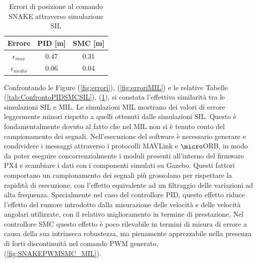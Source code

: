 \begin{table}
	\centering
	\caption{Errori di posizione al comando SNAKE attraverso simulazione SIL}
	\begin{tabular}{c c c}
		\hline
		Errore &  PID [m] & SMC [m] \\
		\hline
		$\epsilon_{max}$ & 0.47 & 0.31  \\
		$\epsilon_{medio}$ & 0.06 & 0.04  \\
		\hline
	\end{tabular}	
	\label{tab:ConfrontoPIDSMCMIL}
\end{table}

Confrontando le Figure (\ref{fig:errori}), (\ref{fig:erroriMIL}) e le relative Tabelle (\ref{tab:ConfrontoPIDSMCSIL}), (\ref{tab:ConfrontoPIDSMCMIL}), si constata l'effettiva similarità tra le simulazioni SIL e MIL. Le simulazioni MIL mostrano dei valori di errore leggermente minori rispetto a quelli ottenuti dalle simulazioni SIL. Questo è fondamentalmente dovuto al fatto che nel MIL non si è tenuto conto del campionamento dei segnali. Nell'esecuzione del software è necessario generare e condividere i messaggi attraverso i protocolli MAVLink e $\micro$ORB, in modo da poter eseguire concorrenzialmente i moduli presenti all'interno del firmware PX4 e scambiare i dati con i componenti simulati su Gazebo. Questi fattori comportano un campionamento dei segnali più grossolano per rispettare la rapidità di esecuzione, con l'effetto equivalente ad un filtraggio delle variazioni ad alta frequenza. Specialmente nel caso del controllore PID, questo effetto riduce l'effetto del rumore introdotto dalla misurazione delle velocità e delle velocità angolari utilizzate, con il relativo miglioramento in termine di prestazione. Nel controllore SMC questo effetto è poco rilevabile in termini di misura di errore a causa della sua intrinseca robustezza, ma pienamente apprezzabile nella presenza di forti discontinuità nel comando PWM generato, (\ref{fig:SNAKEPWMSMC_MIL}).